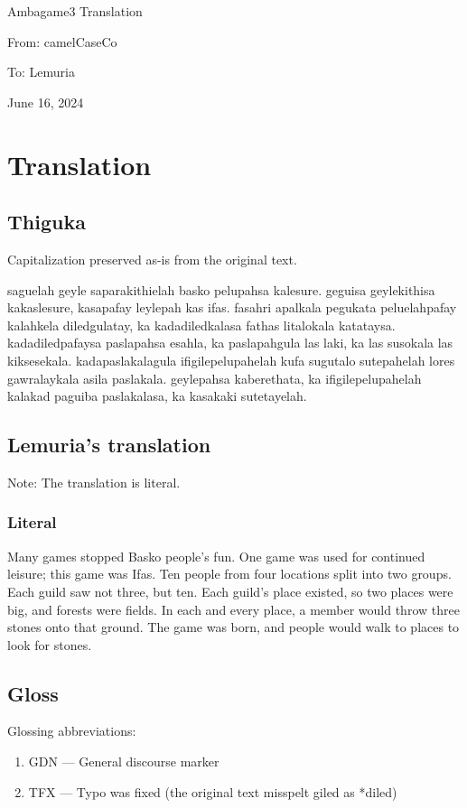 \documentclass{thiguka}
\begin{document}
Ambagame3 Translation

From: camelCaseCo

To: Lemuria

June 16, 2024

\section{Translation}
\subsection{Thiguka}
Capitalization preserved as-is from the original text.

saguelah geyle saparakithielah basko pelupahsa kalesure.
geguisa geylekithisa kakaslesure, kasapafay leylepah kas ifas.
fasahri apalkala pegukata peluelahpafay kalahkela diledgulatay, ka kadadiledkalasa fathas litalokala katataysa.
kadadiledpafaysa paslapahsa esahla, ka paslapahgula las laki, ka las susokala las kiksesekala.
kadapaslakalagula ifigilepelupahelah kufa sugutalo sutepahelah lores gawralaykala asila paslakala.
geylepahsa kaberethata, ka ifigilepelupahelah kalakad paguiba paslakalasa, ka kasakaki sutetayelah.


\subsection{Lemuria's translation}
Note: The translation is literal.

\subsubsection{Literal}
Many games stopped Basko people's fun.
One game was used for continued leisure; this game was Ifas.
Ten people from four locations split into two groups.
Each guild saw not three, but ten.
Each guild's place existed, so two places were big, and forests were fields.
In each and every place, a member would throw three stones onto that ground.
The game was born, and people would walk to places to look for stones.

\subsection{Gloss}
Glossing abbreviations:
\begin{enumerate}
    \item GDN --- General discourse marker
    \item TFX --- Typo was fixed (the original text misspelt giled as *diled)
\end{enumerate}
\end{document}
